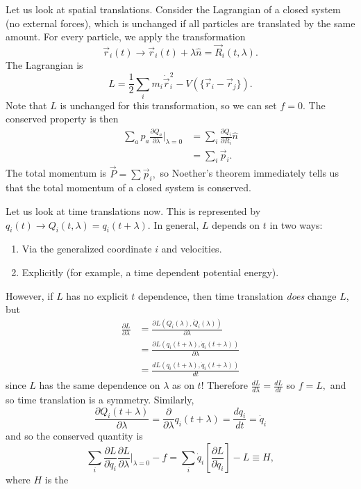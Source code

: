 \documentclass{article}
\numberwithin{equation}{section}
\begin{document}
\begin{example}
    Let us look at spatial translations. Consider the Lagrangian of a closed system (no external forces), which is unchanged if all particles are translated by the same amount. For every particle, we apply the transformation
    \begin{equation*}
        \vec{r}_i(t) \to \vec{r}_i(t) + \lambda\hat{n} = \vec{R}_i(t,\lambda).
    \end{equation*}
    The Lagrangian is
    \begin{equation*}
        L = \frac{1}{2}\sum_i m_i\dot{\vec{r}}_i^2 - V(\{\vec{r}_i-\vec{r}_j\}).
    \end{equation*}
    Note that $L$ is unchanged for this transformation, so we can set $f=0$. The conserved property is then
    \begin{align*}
        \sum_a p_a \frac{\partial Q_a}{\partial \lambda}\biggr|_{\lambda = 0} &= \sum_i \frac{\partial Q_i}{\partial R_i}\hat{n} \\
        &= \sum_i \vec{p}_i.
    \end{align*}
    The total momentum is $\vec{P}=\sum \vec{p}_i,$ so Noether's theorem immediately tells us that the total momentum of a closed system is conserved.
\end{example}
\begin{example}
    Let us look at time translations now. This is represented by $q_i(t) \to Q_i(t,\lambda) = q_i(t+\lambda)$. In general, $L$ depends on $t$ in two ways:
    \begin{enumerate}
        \item Via the generalized coordinate $i$ and velocities.
        \item Explicitly (for example, a time dependent potential energy).
    \end{enumerate}
    However, if $L$ has no explicit $t$ dependence, then time translation \textit{does} change $L$, but
    \begin{align*}
        \frac{\partial L}{\partial \lambda} &= \frac{\partial L(Q_i(\lambda),\dot{Q}_i(\lambda))}{\partial \lambda} \\ 
        &= \frac{\partial L(q_i(t+\lambda),\dot{q}_i(t+\lambda))}{\partial \lambda} \\ 
        &= \frac{dL(q_i(t+\lambda),\dot{q}_i(t+\lambda))}{dt}
    \end{align*}
    since $L$ has the same dependence on $\lambda$ as on $t$! Therefore $\frac{dL}{d\lambda}=\frac{dL}{dt}$ so $f=L,$ and so time translation is a symmetry. Similarly,
    \begin{equation*}
        \frac{\partial Q_i(t+\lambda)}{\partial \lambda} = \frac{\partial}{\partial \lambda}q_i(t+\lambda) = \frac{dq_i}{dt} = \dot{q}_i
    \end{equation*}
    and so the conserved quantity is
    \begin{equation*}
        \sum_i \frac{\partial L}{\partial \dot{q}_i}\frac{\partial L}{\partial \lambda}\biggr|_{\lambda=0} - f = \sum_i \dot{q}_i\left[\frac{\partial L}{\partial \dot{q}_i}\right] - L \equiv H,
    \end{equation*}
    where $H$ is the 
\end{example}
\end{document}
